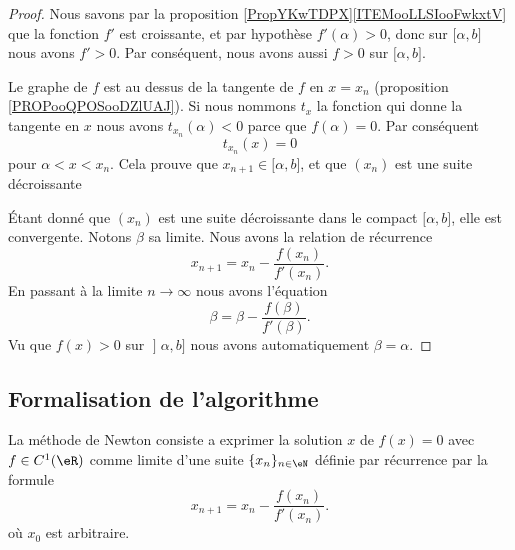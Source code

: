 \begin{proof}
    Nous savons par la proposition \ref{PropYKwTDPX}\ref{ITEMooLLSIooFwkxtV} que la fonction \( f'\) est croissante, et par hypothèse \( f'(\alpha)>0\), donc sur \( \mathopen[ \alpha , b \mathclose]\) nous avons \( f'>0\). Par conséquent, nous avons aussi \( f>0\) sur \( \mathopen[ \alpha , b \mathclose]\).   

    Le graphe de \( f\) est au dessus de la tangente de \( f\) en \( x=x_n\) (proposition \ref{PROPooQPOSooDZlUAJ}). Si nous nommons \( t_x\) la fonction qui donne la tangente en \( x\) nous avons \( t_{x_n}(\alpha)<0\) parce que \( f(\alpha)=0\). Par conséquent
    \begin{equation}
        t_{x_n}(x)=0
    \end{equation}
    pour \( \alpha<x<x_n\). Cela prouve que \( x_{n+1}\in\mathopen[ \alpha , b \mathclose]\), et que \( (x_n)\) est une suite décroissante
    
    Étant donné que \( (x_n)\) est une suite décroissante dans le compact \( \mathopen[ \alpha , b \mathclose]\), elle est convergente. Notons \( \beta\) sa limite. Nous avons la relation de récurrence
    \begin{equation}
        x_{n+1}=x_n-\frac{ f(x_n) }{ f'(x_n) }.
    \end{equation}
    En passant à la limite \( n\to \infty\) nous avons l'équation
    \begin{equation}
        \beta=\beta-\frac{ f(\beta) }{ f'(\beta) }.
    \end{equation}
    Vu que \( f(x)>0\) sur \( \mathopen] \alpha , b \mathclose]\) nous avons automatiquement \( \beta=\alpha\).
\end{proof}

\subsection{Formalisation de l'algorithme}

La méthode de Newton consiste a exprimer la solution $x$ de $f(x)=0$ avec $f\in C^1(\eR)$ comme limite d'une suite $\{x_n\}_{n\in\eN}$ définie par récurrence par la formule
\begin{equation}
	x_{n+1}=x_n-\frac{f(x_n)}{f'(x_n)}.
\end{equation}
où $x_0$ est arbitraire.

